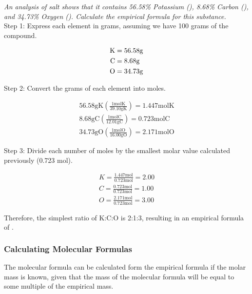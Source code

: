 \begin{example}
\textit{An analysis of salt shows that it contains 56.58\% Potassium (), 8.68\% Carbon (), and 34.73\% Oxygen (). Calculate the empirical formula for this substance.} \\

\noindent
Step 1: Express each element in grams, assuming we have 100 grams of the compound.

\begin{align*}
\ce{K} &= 56.58\mathrm{g} \\
\ce{C} &=  8.68\mathrm{g} \\
\ce{O} &= 34.73\mathrm{g}
\end{align*}

\noindent
Step 2: Convert the grams of each element into moles.

\begin{align*}
56.58 \mathrm{g K} \left( \frac{1 \mathrm{mol K}}{39.10 \mathrm{g K}} \right) = 1.447 \mathrm{mol K} \\
8.68 \mathrm{g C} \left( \frac{1 \mathrm{mol C}}{12.01 \mathrm{g C}} \right) = 0.723 \mathrm{mol C} \\
34.73 \mathrm{g O} \left( \frac{1 \mathrm{mol O}}{16.00 \mathrm{g O}} \right) = 2.171 \mathrm{mol O}
\end{align*}

\noindent
Step 3: Divide each number of moles by the smallest molar value calculated previously (0.723 mol).

\begin{align*}
K = \frac{1.447 \mathrm{mol}}{0.723 \mathrm{mol}} = 2.00 \\
C = \frac{0.723 \mathrm{mol}}{0.723 \mathrm{mol}} = 1.00 \\
O = \frac{2.171 \mathrm{mol}}{0.723 \mathrm{mol}} = 3.00
\end{align*}

\noindent
Therefore, the simplest ratio of K:C:O is 2:1:3, resulting in an empirical formula of .

\end{example}

\subsubsection{Calculating Molecular Formulas}

The molecular formula can be calculated form the empirical formula if the molar mass is known, given that the mass of the molecular formula will be equal to some multiple of the empirical mass. \\


